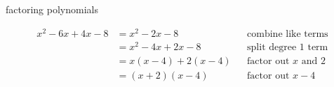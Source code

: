 \begin{problem}{factoring polynomials}

\solution
{
\begin{align*}
    x^2 - 6x + 4x - 8 &= x^2 - 2x - 8        && \text{combine like terms} \\
                      &= x^2 - 4x + 2x - 8   && \text{split degree 1 term} \\
                      &= x(x - 4) + 2(x - 4) && \text{factor out $x$ and 2} \\
                      &= (x + 2)(x - 4)      && \text{factor out $x - 4$}
\end{align*}
}

\end{problem}